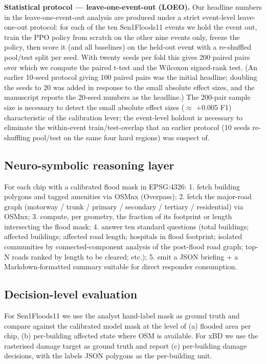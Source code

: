 \textbf{Statistical protocol --- leave-one-event-out (LOEO).} Our headline numbers
in the leave-one-event-out analysis are produced under a strict event-level leave-one-out protocol: for
each of the ten Sen1Floods11 events we hold the event out, train the PPO
policy from scratch on the other nine events only, freeze the policy, then
score it (and all baselines) on the held-out event with a re-shuffled
pool/test split per seed. With twenty seeds per fold this gives 200
paired pairs over which we compute the paired t-test and the Wilcoxon
signed-rank test. (An earlier 10-seed protocol giving 100 paired pairs
was the initial headline; doubling the seeds to 20 was added in
response to the small absolute effect sizes, and the manuscript reports
the 20-seed numbers as the headline.) The 200-pair sample size is
necessary to detect the small absolute
effect sizes ($\approx$ +0.005 F1) characteristic of the calibration lever; the
event-level holdout is necessary to eliminate the within-event
train/test-overlap that an earlier protocol (10 seeds re-shuffling
pool/test on the same four hard regions) was suspect of.

\subsection{Neuro-symbolic reasoning layer}\label{neuro-symbolic-reasoning-layer}

For each chip with a calibrated flood mask in EPSG:4326:
1. fetch building polygons and tagged amenities via OSMnx (Overpass);
2. fetch the major-road graph (motorway / trunk / primary / secondary /
tertiary / residential) via OSMnx;
3. compute, per geometry, the fraction of its footprint or length intersecting
the flood mask;
4. answer ten standard questions (total buildings; affected buildings; affected
road length; hospitals in flood footprint; isolated communities by
connected-component analysis of the post-flood road graph; top-N roads
ranked by length to be cleared; etc.);
5. emit a JSON briefing + a Markdown-formatted summary suitable for direct
responder consumption.

\subsection{Decision-level evaluation}\label{decision-level-evaluation}

For Sen1Floods11 we use the analyst hand-label mask as ground truth and
compare against the calibrated model mask at the level of (a) flooded area
per chip, (b) per-building affected state where OSM is available. For xBD
we use the rasterised damage target as ground truth and report (c)
per-building damage decisions, with the labels JSON polygons as the
per-building unit.

